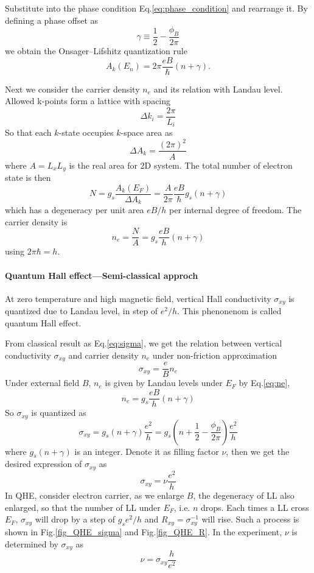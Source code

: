 \documentclass[12pt,a4paper]{article}
\begin{document}
    Substitute into the phase condition Eq.\eqref{eq:phase_condition} and rearrange it. By defining a phase offset as
    \begin{equation}
        \gamma \equiv \frac{1}{2} - \frac{\phi_B}{2\pi}
    \end{equation}
    we obtain the Onsager–Lifshitz quantization rule
    \begin{equation}
        A_k(E_n) = 2\pi \frac{eB}{\hbar} (n + \gamma).
    \end{equation}

    Next we consider the carrier density $n_e$ and its relation with Landau level. Allowed k-points form a lattice with spacing
    \[ \Delta k_i = \frac{2\pi}{L_i} \]
    So that each $k$-state occupies $k$-space area as
    \[ \Delta A_k = \frac{\left(2\pi\right)^2}{A} \]
    where $A = L_x L_y$ is the real area for 2D system. The total number of electron state is then
    \[
        N = g_s \frac{A_k(E_F)}{\Delta A_k}
        = \frac{A}{2\pi} \frac{eB}{\hbar} g_s \left(n + \gamma\right)
    \]
    which has a degeneracy per unit area $eB/h$ per internal degree of freedom. The carrier density is
    \begin{equation}
    \label{eq:ne}
        n_e = \frac{N}{A} = g_s \frac{eB}{h} (n + \gamma)
    \end{equation}
    using $2\pi\hbar = h$.

\paragraph{Quantum Hall effect---Semi-classical approch}

    At zero temperature and high magnetic field, vertical Hall conductivity $\sigma_{xy}$ is quantized due to Landau level, in step of $e^2/h$. This phenonenom is called quantum Hall effect.

    From classical result as Eq.\eqref{eq:sigma}, we get the relation between vertical conductivity $\sigma_{xy}$ and carrier density $n_e$ under non-friction approximation
    \[ \sigma_{xy} = \frac{e}{B} n_e\]
    Under external field $B$, $n_e$ is given by Landau levels under $E_F$ by Eq.\eqref{eq:ne},
    \[ n_e = g_s \frac{eB}{h} (n + \gamma) \]
    So $\sigma_{xy}$ is quantized as
    \[ \sigma_{xy}
    = g_s (n + \gamma) \frac{e^2}{h}
    = g_s (n + \frac{1}{2} - \frac{\phi_B}{2\pi}) \frac{e^2}{h} \]
    where $g_s(n+\gamma)$ is an integer. Denote it as filling factor $\nu$, then we get the desired expression of $\sigma_{xy}$ as
    \begin{equation}
    \label{eq:sigmaxy_semi}
        \sigma_{xy} = \nu \frac{e^2}{h}
    \end{equation}
    In QHE, consider electron carrier, as we enlarge $B$, the degeneracy of LL also enlarged, so that the number of LL under $E_F$, i.e. $n$ drops. Each times a LL cross $E_F$, $\sigma_{xy}$ will drop by a step of $g_s e^2/h$ and $R_{xy} = \sigma_{xy}^{-1}$ will rise. Such a process is shown in Fig.\ref{fig_QHE_sigma} and Fig.\ref{fig_QHE_R}. In the experiment, $\nu$ is determined by $\sigma_{xy}$ as
    \[ \nu = \sigma_{xy} \frac{h}{e^2} \]
\end{document}
